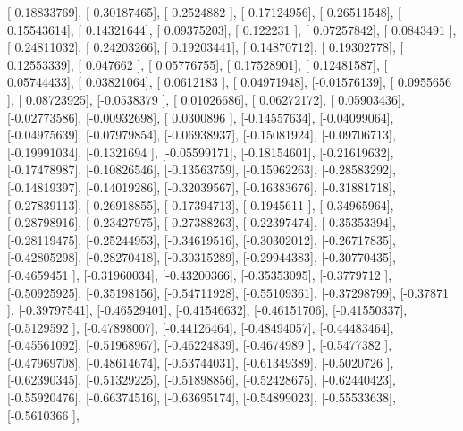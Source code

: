 \documentclass{article}
\begin{document}
       [ 0.18833769],
       [ 0.30187465],
       [ 0.2524882 ],
       [ 0.17124956],
       [ 0.26511548],
       [ 0.15543614],
       [ 0.14321644],
       [ 0.09375203],
       [ 0.122231  ],
       [ 0.07257842],
       [ 0.0843491 ],
       [ 0.24811032],
       [ 0.24203266],
       [ 0.19203441],
       [ 0.14870712],
       [ 0.19302778],
       [ 0.12553339],
       [ 0.047662  ],
       [ 0.05776755],
       [ 0.17528901],
       [ 0.12481587],
       [ 0.05744433],
       [ 0.03821064],
       [ 0.0612183 ],
       [ 0.04971948],
       [-0.01576139],
       [ 0.0955656 ],
       [ 0.08723925],
       [-0.0538379 ],
       [ 0.01026686],
       [ 0.06272172],
       [ 0.05903436],
       [-0.02773586],
       [-0.00932698],
       [ 0.0300896 ],
       [-0.14557634],
       [-0.04099064],
       [-0.04975639],
       [-0.07979854],
       [-0.06938937],
       [-0.15081924],
       [-0.09706713],
       [-0.19991034],
       [-0.1321694 ],
       [-0.05599171],
       [-0.18154601],
       [-0.21619632],
       [-0.17478987],
       [-0.10826546],
       [-0.13563759],
       [-0.15962263],
       [-0.28583292],
       [-0.14819397],
       [-0.14019286],
       [-0.32039567],
       [-0.16383676],
       [-0.31881718],
       [-0.27839113],
       [-0.26918855],
       [-0.17394713],
       [-0.1945611 ],
       [-0.34965964],
       [-0.28798916],
       [-0.23427975],
       [-0.27388263],
       [-0.22397474],
       [-0.35353394],
       [-0.28119475],
       [-0.25244953],
       [-0.34619516],
       [-0.30302012],
       [-0.26717835],
       [-0.42805298],
       [-0.28270418],
       [-0.30315289],
       [-0.29944383],
       [-0.30770435],
       [-0.4659451 ],
       [-0.31960034],
       [-0.43200366],
       [-0.35353095],
       [-0.3779712 ],
       [-0.50925925],
       [-0.35198156],
       [-0.54711928],
       [-0.55109361],
       [-0.37298799],
       [-0.37871   ],
       [-0.39797541],
       [-0.46529401],
       [-0.41546632],
       [-0.46151706],
       [-0.41550337],
       [-0.5129592 ],
       [-0.47898007],
       [-0.44126464],
       [-0.48494057],
       [-0.44483464],
       [-0.45561092],
       [-0.51968967],
       [-0.46224839],
       [-0.4674989 ],
       [-0.5477382 ],
       [-0.47969708],
       [-0.48614674],
       [-0.53744031],
       [-0.61349389],
       [-0.5020726 ],
       [-0.62390345],
       [-0.51329225],
       [-0.51898856],
       [-0.52428675],
       [-0.62440423],
       [-0.55920476],
       [-0.66374516],
       [-0.63695174],
       [-0.54899023],
       [-0.55533638],
       [-0.5610366 ],
\end{document}
